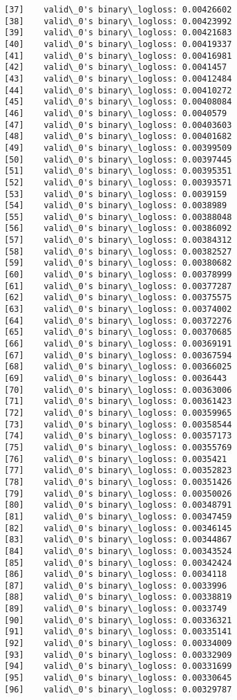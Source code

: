\documentclass[11pt]{article}
\begin{document}
\begin{Verbatim}[commandchars=\\\{\}]
[37]	valid\_0's binary\_logloss: 0.00426602
[38]	valid\_0's binary\_logloss: 0.00423992
[39]	valid\_0's binary\_logloss: 0.00421683
[40]	valid\_0's binary\_logloss: 0.00419337
[41]	valid\_0's binary\_logloss: 0.00416981
[42]	valid\_0's binary\_logloss: 0.0041457
[43]	valid\_0's binary\_logloss: 0.00412484
[44]	valid\_0's binary\_logloss: 0.00410272
[45]	valid\_0's binary\_logloss: 0.00408084
[46]	valid\_0's binary\_logloss: 0.0040579
[47]	valid\_0's binary\_logloss: 0.00403603
[48]	valid\_0's binary\_logloss: 0.00401682
[49]	valid\_0's binary\_logloss: 0.00399509
[50]	valid\_0's binary\_logloss: 0.00397445
[51]	valid\_0's binary\_logloss: 0.00395351
[52]	valid\_0's binary\_logloss: 0.00393571
[53]	valid\_0's binary\_logloss: 0.0039159
[54]	valid\_0's binary\_logloss: 0.0038989
[55]	valid\_0's binary\_logloss: 0.00388048
[56]	valid\_0's binary\_logloss: 0.00386092
[57]	valid\_0's binary\_logloss: 0.00384312
[58]	valid\_0's binary\_logloss: 0.00382527
[59]	valid\_0's binary\_logloss: 0.00380682
[60]	valid\_0's binary\_logloss: 0.00378999
[61]	valid\_0's binary\_logloss: 0.00377287
[62]	valid\_0's binary\_logloss: 0.00375575
[63]	valid\_0's binary\_logloss: 0.00374002
[64]	valid\_0's binary\_logloss: 0.00372276
[65]	valid\_0's binary\_logloss: 0.00370685
[66]	valid\_0's binary\_logloss: 0.00369191
[67]	valid\_0's binary\_logloss: 0.00367594
[68]	valid\_0's binary\_logloss: 0.00366025
[69]	valid\_0's binary\_logloss: 0.0036443
[70]	valid\_0's binary\_logloss: 0.00363006
[71]	valid\_0's binary\_logloss: 0.00361423
[72]	valid\_0's binary\_logloss: 0.00359965
[73]	valid\_0's binary\_logloss: 0.00358544
[74]	valid\_0's binary\_logloss: 0.00357173
[75]	valid\_0's binary\_logloss: 0.00355769
[76]	valid\_0's binary\_logloss: 0.0035421
[77]	valid\_0's binary\_logloss: 0.00352823
[78]	valid\_0's binary\_logloss: 0.00351426
[79]	valid\_0's binary\_logloss: 0.00350026
[80]	valid\_0's binary\_logloss: 0.00348791
[81]	valid\_0's binary\_logloss: 0.00347459
[82]	valid\_0's binary\_logloss: 0.00346145
[83]	valid\_0's binary\_logloss: 0.00344867
[84]	valid\_0's binary\_logloss: 0.00343524
[85]	valid\_0's binary\_logloss: 0.00342424
[86]	valid\_0's binary\_logloss: 0.0034118
[87]	valid\_0's binary\_logloss: 0.0033996
[88]	valid\_0's binary\_logloss: 0.00338819
[89]	valid\_0's binary\_logloss: 0.0033749
[90]	valid\_0's binary\_logloss: 0.00336321
[91]	valid\_0's binary\_logloss: 0.00335141
[92]	valid\_0's binary\_logloss: 0.00334009
[93]	valid\_0's binary\_logloss: 0.00332909
[94]	valid\_0's binary\_logloss: 0.00331699
[95]	valid\_0's binary\_logloss: 0.00330645
[96]	valid\_0's binary\_logloss: 0.00329787

\end{Verbatim}
\end{document}
